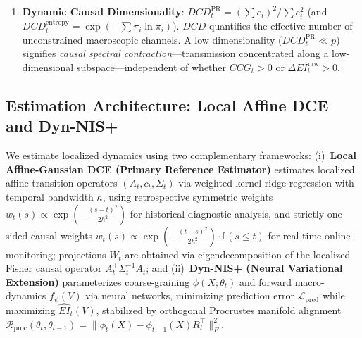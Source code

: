 \documentclass[10pt,twocolumn,journal]{article}
\begin{document}
\begin{enumerate}[noitemsep,topsep=1pt,partopsep=0pt,parsep=0pt]
    \item \textbf{Dynamic Causal Dimensionality}: $DCD_t^{\text{PR}} = (\sum e_i)^2 / \sum e_i^2$ (and $DCD_t^{\text{entropy}} = \exp(-\sum \pi_i \ln \pi_i)$). $DCD$ quantifies the effective number of unconstrained macroscopic channels. A low dimensionality ($DCD_t^{\text{PR}} \ll p$) signifies \textit{causal spectral contraction}—transmission concentrated along a low-dimensional subspace—independent of whether $CCG_t > 0$ or $\Delta EI_t^{\text{raw}} > 0$.
\end{enumerate}

\subsection{Estimation Architecture: Local Affine DCE and Dyn-NIS+}
We estimate localized dynamics using two complementary frameworks: (i)~\textbf{Local Affine-Gaussian DCE (Primary Reference Estimator)} estimates localized affine transition operators $(A_t, c_t, \Sigma_t)$ via weighted kernel ridge regression with temporal bandwidth $h$, using retrospective symmetric weights $w_t(s) \propto \exp(-\frac{(s-t)^2}{2h^2})$ for historical diagnostic analysis, and strictly one-sided causal weights $w_t(s) \propto \exp(-\frac{(t-s)^2}{2h^2}) \cdot \mathbb{I}(s \le t)$ for real-time online monitoring; projections $W_t$ are obtained via eigendecomposition of the localized Fisher causal operator $A_t^\top \Sigma_t^{-1} A_t$; and (ii)~\textbf{Dyn-NIS+ (Neural Variational Extension)} parameterizes coarse-graining $\phi(X; \theta_t)$ and forward macro-dynamics $f_\psi(V)$ via neural networks, minimizing prediction error $\mathcal{L}_{\text{pred}}$ while maximizing $\widehat{EI}_t(V)$, stabilized by orthogonal Procrustes manifold alignment $\mathcal{R}_{\text{proc}}(\theta_t, \theta_{t-1}) = \|\phi_t(X) - \phi_{t-1}(X) R_t^\top\|_F^2$.
\end{document}
